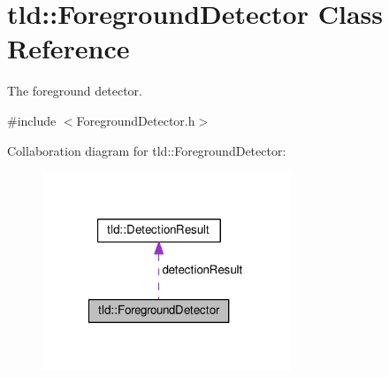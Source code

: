 \hypertarget{classtld_1_1ForegroundDetector}{\section{tld\-:\-:Foreground\-Detector Class Reference}
\label{classtld_1_1ForegroundDetector}
}


The foreground detector.  




{\ttfamily \#include $<$Foreground\-Detector.\-h$>$}



Collaboration diagram for tld\-:\-:Foreground\-Detector\-:\nopagebreak
\begin{figure}[H]
\begin{center}
\leavevmode
\includegraphics[width=211pt]{classtld_1_1ForegroundDetector__coll__graph}
\end{center}
\end{figure}
